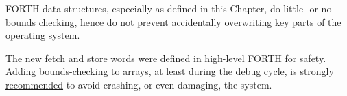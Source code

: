 \leftbar[1\linewidth]
FORTH data structures, especially as defined in this Chapter, do little- or no bounds checking, hence do not prevent accidentally overwriting key parts of the operating system.

The new fetch and store words were defined in high-level FORTH for safety. Adding bounds-checking to arrays, at least during the debug cycle, is \underline{strongly recommended} to avoid crashing, or even damaging, the system.
\endleftbar


